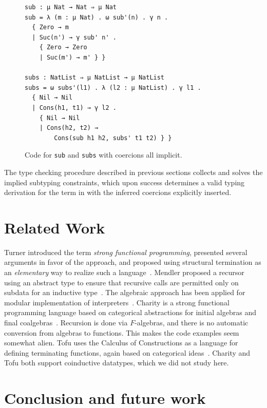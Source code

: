 \documentclass[pdflatex,sn-mathphys-num]{sn-jnl}%
\theoremstyle{thmstyleone}%
\theoremstyle{thmstyletwo}%
\theoremstyle{thmstylethree}%
\begin{document}
\begin{figure}[tb]
  \centering

  \begin{verbatim}
sub : μ Nat → Nat ⇒ μ Nat
sub = λ (m : μ Nat) . ω sub'(n) . γ n .
  { Zero → m
  | Suc(n') → γ sub' n' .
    { Zero → Zero
    | Suc(m') → m' } }

subs : NatList ⇒ μ NatList → μ NatList
subs = ω subs'(l1) . λ (l2 : μ NatList) . γ l1 .
  { Nil → Nil
  | Cons(h1, t1) → γ l2 .
    { Nil → Nil
    | Cons(h2, t2) →
        Cons(sub h1 h2, subs' t1 t2) } }
  \end{verbatim}
  \caption{Code for \texttt{sub} and \texttt{subs} with coercions all implicit.}
  \label{fig:example-subs-algebraic-without-coercions}
\end{figure}

The type checking procedure described in previous sections collects and solves the implied subtyping constraints, which upon success determines a valid typing derivation for the term in \lcata with the inferred coercions explicitly inserted.

\section{Related Work} %

Turner introduced the term \emph{strong functional programming},
presented several arguments in favor of the approach, and proposed
using structural termination as an \emph{elementary} way to realize
such a language~\cite{turner95}.  Mendler proposed a recursor using an
abstract type to ensure that recursive calls are permitted only on
subdata for an inductive type~\cite{mendler91}.  The algebraic
approach has been applied for modular implementation of
interpreters~\cite{swierstra08}.  Charity is a strong functional
programming language based on categorical abstractions for initial
algebras and final coalgebras~\citep{charity92}.  Recursion is done
via $F$-algebras, and there is no automatic conversion from algebras
to functions.  This makes the code examples seem somewhat alien. Tofu
uses the Calculus of Constructions as a language for defining
terminating functions, again based on categorical
ideas~\citep{tofu10}.  Charity and Tofu both support coinductive
datatypes, which we did not study here.


\section{Conclusion and future work} %
\end{document}
